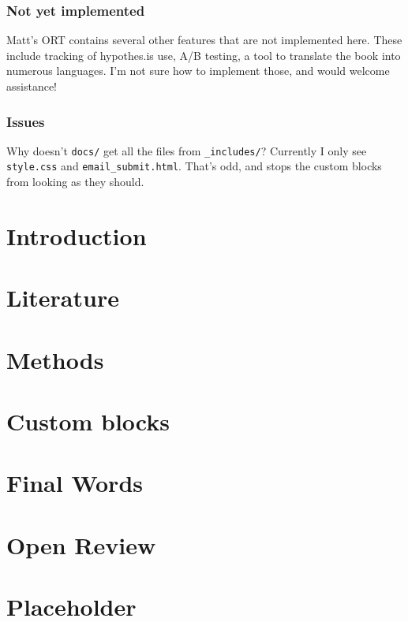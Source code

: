 \documentclass[]{book}
\begin{document}
\subsection{Not yet implemented}\label{not-yet-implemented}

Matt's ORT contains several other features that are not implemented
here. These include tracking of hypothes.is use, A/B testing, a tool to
translate the book into numerous languages. I'm not sure how to
implement those, and would welcome assistance!

\subsection{Issues}\label{issues}

Why doesn't \texttt{docs/} get all the files from \texttt{\_includes/}?
Currently I only see \texttt{style.css} and \texttt{email\_submit.html}.
That's odd, and stops the custom blocks from looking as they should.

\chapter{Introduction}\label{intro}

\chapter{Literature}\label{literature}

\chapter{Methods}\label{methods}

\chapter{Custom blocks}\label{custom-blocks}

\chapter{Final Words}\label{final-words}

\chapter{Open Review}\label{open-review}

\chapter{Placeholder}\label{placeholder}
\end{document}
